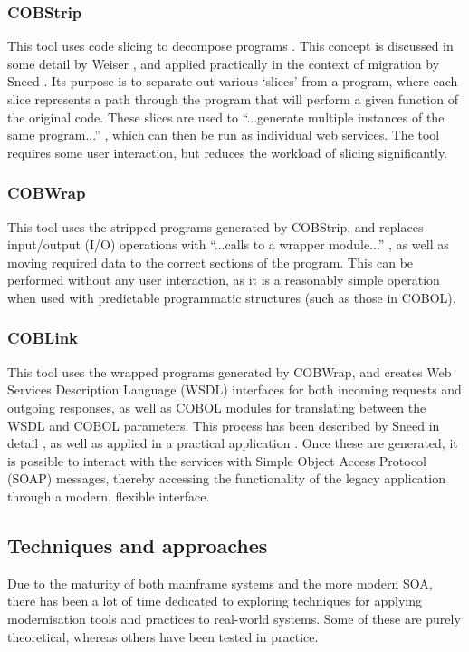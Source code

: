 \documentclass[12pt,journal,compsoc]{IEEEtran}
\begin{document}
\subsubsection{COBStrip}
\label{subsubsec:cobstrip}
This tool uses code slicing to decompose programs \cite{Canfora2000}. This concept is discussed in some detail by Weiser \cite{Weiser1984}, and applied practically in the context of migration by Sneed \cite{Sneed2009,Sneed2008}. Its purpose is to separate out various `slices' from a program, where each slice represents a path through the program that will perform a given function of the original code. These slices are used to ``...generate multiple instances of the same program...'' \cite{Sneed2009,Sneed2008}, which can then be run as individual web services. The tool requires some user interaction, but reduces the workload of slicing significantly.

\subsubsection{COBWrap}
\label{subsubsec:cobwrap}
This tool uses the stripped programs generated by COBStrip, and replaces input/output (I/O) operations with ``...calls to a wrapper module...'' \cite{Sneed2009,Sneed2008}, as well as moving required data to the correct sections of the program. This can be performed without any user interaction, as it is a reasonably simple operation when used with predictable programmatic structures (such as those in COBOL).

\subsubsection{COBLink}
\label{subsubsec:coblink}
This tool uses the wrapped programs generated by COBWrap, and creates Web Services Description Language (WSDL) \cite{Christensen2001} interfaces for both incoming requests and outgoing responses, as well as COBOL modules for translating between the WSDL and COBOL parameters. This process has been described by Sneed in detail \cite{Sneed2001}, as well as applied in a practical application \cite{Sneed2009,Sneed2008}. Once these are generated, it is possible to interact with the services with Simple Object Access Protocol (SOAP) \cite{Gudgin2013} messages, thereby accessing the functionality of the legacy application through a modern, flexible interface.

\subsection{Techniques and approaches}
\label{subsec:techniques}
Due to the maturity of both mainframe systems and the more modern SOA, there has been a lot of time dedicated to exploring techniques for applying modernisation tools and practices to real-world systems. Some of these are purely theoretical, whereas others have been tested in practice.
\end{document}
